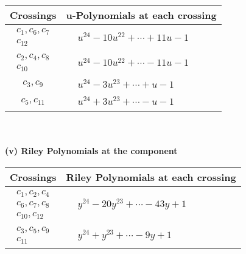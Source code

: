 \documentclass[1p]{elsarticle_modified}
\theoremstyle{definition}
\begin{document}
\begin{tabular}{m{50pt}|m{274pt}}
Crossings & \hspace{64pt}u-Polynomials at each crossing \\
\hline $$\begin{aligned}c_{1},c_{6},c_{7}\\c_{12}\end{aligned}$$&$\begin{aligned}
&u^{24}-10 u^{22}+\cdots+11 u-1
\end{aligned}$\\
\hline $$\begin{aligned}c_{2},c_{4},c_{8}\\c_{10}\end{aligned}$$&$\begin{aligned}
&u^{24}-10 u^{22}+\cdots-11 u-1
\end{aligned}$\\
\hline $$\begin{aligned}c_{3},c_{9}\end{aligned}$$&$\begin{aligned}
&u^{24}-3 u^{23}+\cdots+u-1
\end{aligned}$\\
\hline $$\begin{aligned}c_{5},c_{11}\end{aligned}$$&$\begin{aligned}
&u^{24}+3 u^{23}+\cdots- u-1
\end{aligned}$\\
\hline
\end{tabular}\\~\\
\newpage\renewcommand{\arraystretch}{1}
\flushleft \textbf{(v) Riley Polynomials at the component}\newline \\
\begin{tabular}{m{50pt}|m{274pt}}
Crossings & \hspace{64pt}Riley Polynomials at each crossing \\
\hline $$\begin{aligned}c_{1},c_{2},c_{4}\\c_{6},c_{7},c_{8}\\c_{10},c_{12}\end{aligned}$$&$\begin{aligned}
&y^{24}-20 y^{23}+\cdots-43 y+1
\end{aligned}$\\
\hline $$\begin{aligned}c_{3},c_{5},c_{9}\\c_{11}\end{aligned}$$&$\begin{aligned}
&y^{24}+y^{23}+\cdots-9 y+1
\end{aligned}$\\
\hline
\end{tabular}\\~\\
\end{document}

